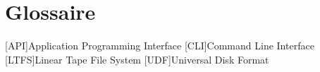 
\chapter*{Glossaire}
\begin{acronym}
	[API]{Application Programming Interface}
	[CLI]{Command Line Interface}
	[LTFS]{Linear Tape File System}
	[UDF]{Universal Disk Format}
\end{acronym}
